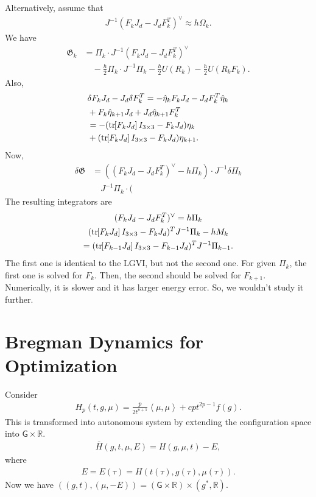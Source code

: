 \documentclass[letterpaper, 10pt, conference]{ieeeconf}
\newcommand{\bracket}[1]{\ensuremath{\left[ #1 \right]}}
\newcommand{\tr}[1]{\mbox{tr}\ensuremath{\negthickspace\bracket{#1}}}
\newcommand{\G}{\ensuremath{\mathsf{G}}}
\renewcommand{\Re}{\ensuremath{\mathbb{R}}}
\newcommand{\pair}[1]{\ensuremath{\left\langle #1 \right\rangle}}
\begin{document}
Alternatively, assume that
\begin{align*}
    J^{-1} (F_k J_d - J_d F_k^T)^\vee \approx h\Omega_k.
\end{align*}
We have
\begin{align*}
    \mathfrak{G}_k & =  \Pi_k \cdot J^{-1} (F_k J_d - J_d F_k^T)^\vee  \\
    &\quad - \frac{h}{2} \Pi_k \cdot J^{-1}\Pi_k - \frac{h}{2} U(R_k) - \frac{h}{2} U(R_k F_k).
\end{align*}
Also,
\begin{align*}
    & \delta F_k J_d - J_d\delta F_k^T =-\hat\eta_k F_k J_d -J_d F_k^T\hat\eta_k\\
    & + F_k\hat\eta_{k+1} J_d + J_d \hat\eta_{k+1} F_k^T\\
    & = - (\tr{F_kJ_d}I_{3\times 3} -F_k J_d)\eta_k\\
    & + (\tr{F_kJ_d}I_{3\times 3} - F_kJ_d)\eta_{k+1}.
\end{align*}
Now,
\begin{align*}
    \delta \mathfrak{G} & = ( (F_k J_d - J_d F_k^T)^\vee  - h\Pi_k) \cdot J^{-1}\delta\Pi_k\\
                        & \quad J^{-1}\Pi_k \cdot (
\end{align*}
The resulting integrators are
\begin{gather*}
(F_k J_d - J_d F_k^T)^\vee  = h\Pi_k \\
(\tr{F_kJ_d}I_{3\times 3} -F_k J_d)^T J^{-1}\Pi_k - hM_k\\ =
(\tr{F_{k-1}J_d}I_{3\times 3} -F_{k-1} J_d)^T J^{-1}\Pi_{k-1} .
\end{gather*}
The first one is identical to the LGVI, but not the second one. 
For given $\Pi_k$, the first one is solved for $F_k$. 
Then, the second should be solved for $F_{k+1}$.
Numerically, it is slower and it has larger energy error. 
So, we wouldn't study it further. 

\section{Bregman Dynamics for Optimization}

Consider
\begin{align*}
    H_p(t,g,\mu) = \frac{p}{2t^{p+1}} \pair{\mu,\mu} + cp t^{2p-1} f(g).
\end{align*}
This is transformed into autonomous system by extending the configuration space into $\G\times \Re$.
\begin{align*}
    \bar H (g,t,\mu,E) = H(g,\mu,t) -E,
\end{align*}
where
\begin{align*}
    E = E(\tau) = H(t(\tau), g(\tau),\mu(\tau)).
\end{align*}
Now we have $((g,t),(\mu,-E)) = (\G\times \Re)\times(g^*, \Re)$.
\end{document}
